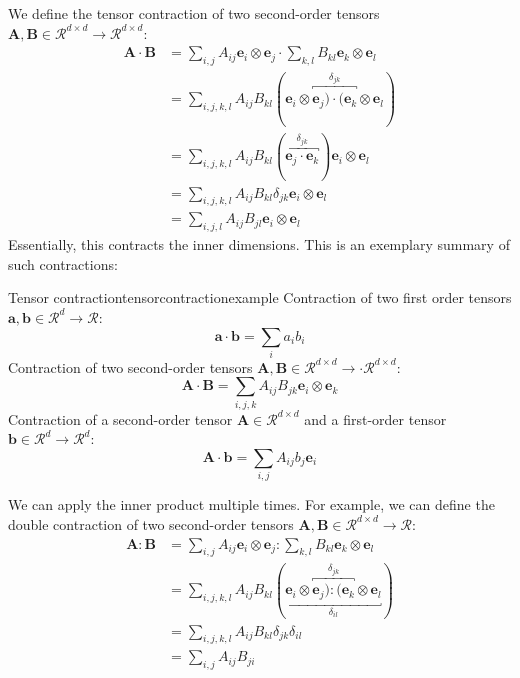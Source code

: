 We define the tensor contraction of two second-order tensors $\mathbf{A},\mathbf{B} \in \mathcal{R}^{d \times d} \rightarrow \mathcal{R}^{d \times d}$: 
\begin{align}
    \mathbf{A} \cdot \mathbf{B} 
        &= \sum_{i,j} A_{ij} \mathbf{e}_i \otimes \mathbf{e}_j \cdot \sum_{k,l}B_{kl} \mathbf{e}_k \otimes \mathbf{e}_l \\
        &= \sum_{i,j,k,l} A_{ij} B_{kl} (\mathbf{e}_i \otimes \overbracket{\mathbf{e}_j) \cdot  (\mathbf{e}_k}^{\delta_{jk}} \otimes \mathbf{e}_l) \\
        &= \sum_{i,j,k,l} A_{ij} B_{kl} (\overbracket{\mathbf{e}_j \cdot  \mathbf{e}_k}^{\delta_{jk}}) \mathbf{e}_i \otimes \mathbf{e}_l \\
        &= \sum_{i,j,k,l} A_{ij}B_{kl} \delta_{jk} \mathbf{e}_i \otimes \mathbf{e}_l \\
        &= \sum_{i,j,l} A_{ij}B_{jl} \mathbf{e}_i \otimes \mathbf{e}_l
\end{align}
Essentially, this contracts the inner dimensions. This is an exemplary summary of such contractions:

\begin{example}{Tensor contraction}{tensorcontractionexample}
    Contraction of two first order tensors $\mathbf{a},\mathbf{b} \in \mathcal{R}^d \rightarrow \mathcal{R}$: 
    \begin{equation}
        \mathbf{a} \cdot \mathbf{b} = \sum_i a_i b_i 
    \end{equation}
    Contraction of two second-order tensors $\mathbf{A},\mathbf{B} \in \mathcal{R}^{d \times d} \rightarrow \cdot \mathcal{R}^{d \times d}$: 
    \begin{equation}
        \mathbf{A} \cdot \mathbf{B} = \sum_{i,j,k} A_{ij} B_{jk} \mathbf{e}_i \otimes \mathbf{e}_k
    \end{equation}
    Contraction of a second-order tensor $\mathbf{A} \in \mathcal{R}^{d \times d}$ and a first-order tensor $\mathbf{b} \in \mathcal{R}^d \rightarrow \mathcal{R}^d$: 
    \begin{equation}
        \mathbf{A} \cdot \mathbf{b} = \sum_{i,j} A_{ij} b_j \mathbf{e}_i 
    \end{equation}
\end{example}

We can apply the inner product multiple times. For example, we can define the double contraction of two second-order tensors $\mathbf{A},\mathbf{B} \in \mathcal{R}^{d \times d} \rightarrow \mathcal{R}$: 
\begin{align}
    \mathbf{A} : \mathbf{B} 
        &= \sum_{i,j} A_{ij} \mathbf{e}_i \otimes \mathbf{e}_j :  \sum_{k,l} B_{kl} \mathbf{e}_k \otimes \mathbf{e}_l \\
        &= \sum_{i,j,k,l} A_{ij}B_{kl} (\underbracket{\mathbf{e}_i \otimes \overbracket{\mathbf{e}_j) :  (\mathbf{e}_k}^{\delta_{jk}} \otimes \mathbf{e}_l}_{\delta_{il}}) \\
        &= \sum_{i,j,k,l} A_{ij}B_{kl} \delta_{jk} \delta_{il} \\
        &= \sum_{i,j} A_{ij}B_{ji}
\end{align}


